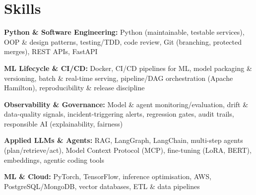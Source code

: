 \documentclass[10pt,a4paper]{article}
\begin{document}
\section{Skills}
\begin{tight}
  \item[\textcolor{accent}{\small$\bullet$}] \textbf{Python \& Software Engineering:} Python (maintainable, testable services), OOP \& design patterns, testing/TDD, code review, Git (branching, protected merges), REST APIs, FastAPI
  \item[\textcolor{accent}{\small$\bullet$}] \textbf{ML Lifecycle \& CI/CD:} Docker, CI/CD pipelines for ML, model packaging \& versioning, batch \& real-time serving, pipeline/DAG orchestration (Apache Hamilton), reproducibility \& release discipline
  \item[\textcolor{accent}{\small$\bullet$}] \textbf{Observability \& Governance:} Model \& agent monitoring/evaluation, drift \& data-quality signals, incident-triggering alerts, regression gates, audit trails, responsible AI (explainability, fairness)
  \item[\textcolor{accent}{\small$\bullet$}] \textbf{Applied LLMs \& Agents:} RAG, LangGraph, LangChain, multi-step agents (plan/retrieve/act), Model Context Protocol (MCP), fine-tuning (LoRA, BERT), embeddings, agentic coding tools
  \item[\textcolor{accent}{\small$\bullet$}] \textbf{ML \& Cloud:} PyTorch, TensorFlow, inference optimisation, AWS, PostgreSQL/MongoDB, vector databases, ETL \& data pipelines
\end{tight}

\end{document}
